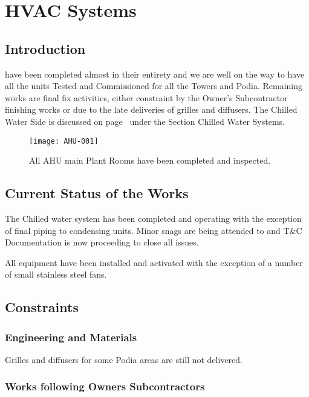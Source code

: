 \chapter{HVAC Systems}
\section{Introduction}
\label{HVAC}

 have been completed almost in their entirety and we are well
on the way to have all the units Tested and Commissioned for all the Towers and Podia. Remaining
works are final fix activities, either constraint by the Owner's Subcontractor finishing works or
due to the late deliveries of grilles and diffusers. The Chilled
Water Side is discussed on page~\pageref{chilledwater} under the Section Chilled Water Systems.

\begin{figure*}%
  \texttt{[image: AHU-001]}
  \caption{All AHU main Plant Rooms have been completed and inspected.}
  \label{fig:marginfig1}
\end{figure*}

\section{Current Status of the Works}

The Chilled water system has been completed and operating with the exception of final piping to
condensing units. Minor snags are being attended to and T\&C Documentation is now proceeding  to close all issues.

All equipment have been installed and activated with the exception of a number of small stainless steel fans. 

\section{Constraints}
\subsection{Engineering and Materials}

Grilles and diffusers for some Podia areas are still not delivered. 

\subsection{Works following Owners Subcontractors}


